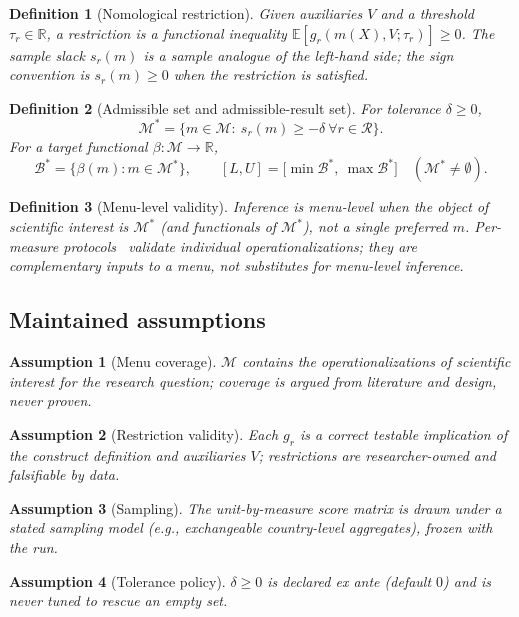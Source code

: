 \documentclass[10pt,letterpaper]{article}
\newtheorem{definition}{Definition}[section]
\newtheorem{assumption}{Assumption}[section]
\newcommand{\M}{\ensuremath{\mathcal{M}}}
\newcommand{\E}{\mathbb{E}}
\newcommand{\Rset}{\mathcal{R}}
\newcommand{\Bset}{\mathcal{B}}
\begin{document}
\begin{definition}[Nomological restriction]
Given auxiliaries $V$ and a threshold $\tau_r\in\mathbb{R}$, a \emph{restriction} is a functional inequality $\E[g_r(m(X),V;\tau_r)]\ge 0$.
The \emph{sample slack} $s_r(m)$ is a sample analogue of the left-hand side; the sign convention is $s_r(m)\ge 0$ when the restriction is satisfied.
\end{definition}

\begin{definition}[Admissible set and admissible-result set]
For tolerance $\delta\ge 0$,
\[
\M^*=\bigl\{m\in\M:\ s_r(m)\ge-\delta\ \forall r\in\Rset\bigr\}.
\]
For a target functional $\beta:\M\to\mathbb{R}$,
\[
\Bset^*=\bigl\{\beta(m):m\in\M^*\bigr\},\qquad
[L,U]=\bigl[\min\Bset^*,\ \max\Bset^*\bigr]\quad(\M^*\neq\emptyset).
\]
\end{definition}

\begin{definition}[Menu-level validity]
Inference is \emph{menu-level} when the object of scientific interest is $\M^*$ (and functionals of $\M^*$), not a single preferred $m$.
Per-measure protocols~\cite{proxy2026,halterman2026} validate individual operationalizations; they are complementary inputs to a menu, not substitutes for menu-level inference.
\end{definition}

\subsection{Maintained assumptions}
\begin{assumption}[Menu coverage]
$\M$ contains the operationalizations of scientific interest for the research question; coverage is argued from literature and design, never proven.
\end{assumption}
\begin{assumption}[Restriction validity]
Each $g_r$ is a correct testable implication of the construct definition and auxiliaries $V$; restrictions are researcher-owned and falsifiable by data.
\end{assumption}
\begin{assumption}[Sampling]
The unit-by-measure score matrix is drawn under a stated sampling model (e.g., exchangeable country-level aggregates), frozen with the run.
\end{assumption}
\begin{assumption}[Tolerance policy]
$\delta\ge 0$ is declared ex ante (default $0$) and is never tuned to rescue an empty set.
\end{assumption}
\end{document}
